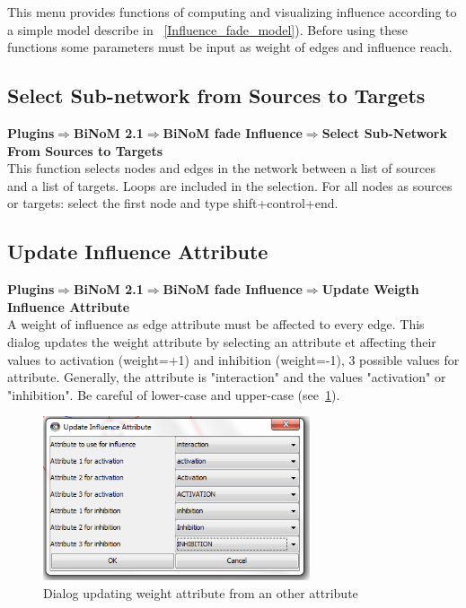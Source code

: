 This menu provides functions of computing and visualizing influence according to a simple model describe in ~\ref{Influence_fade_model}). Before using these functions some parameters must be input as weight of edges and influence reach.

\subsection{Select Sub-network from Sources to Targets}
\textbf{Plugins$\Rightarrow$BiNoM 2.1$\Rightarrow$BiNoM fade Influence$\Rightarrow$Select Sub-Network From Sources to Targets}\\
This function selects nodes and edges in the network between a list of sources and a list of targets.  Loops are included in the selection. For all nodes as sources or targets: select the first node and type shift+control+end.

\subsection{Update Influence Attribute}
\textbf{Plugins$\Rightarrow$BiNoM 2.1$\Rightarrow$BiNoM fade Influence$\Rightarrow$Update Weigth Influence Attribute}\\
A weight of influence as edge attribute must be affected to every edge. This dialog updates the weight attribute by selecting an  attribute et affecting their values to activation (weight=+1) and inhibition (weight=-1), 3 possible values for attribute. Generally, the attribute is "interaction" and the values "activation" or "inhibition". Be careful of lower-case and upper-case (see~\ref{Weight_Attribute_Dialog}).

\begin{figure}
\centering
\includegraphics[width=0.7\textwidth]{graphics/Weight_Attribute_Dialog}
\caption{Dialog updating weight attribute from an other attribute}
\label{Weight_Attribute_Dialog}
\end{figure}

